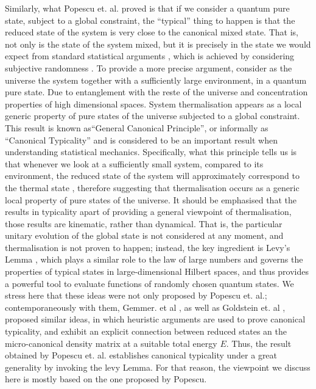 Similarly, what Popescu et. al. proved is that if we consider a quantum pure state, subject to a global constraint, the ``typical'' thing to happen is that the reduced state of the system is  very close to the canonical mixed state. That is, not only is the state of the system mixed, but it is precisely in the state we would expect from standard statistical arguments \cite{popescu_foundations_2005}, which is achieved by considering  subjective randomness \cite{deutsch_thermodynamic_2010,singh_foundations_2013}. To provide a more precise argument, consider as the universe the system together with a sufficiently large environment, in a quantum pure state. Due to entanglement with the reste of the universe and concentration properties of high dimensional spaces. System thermalisation appears as a local generic property of pure states of the universe subjected to a global constraint. This result is known as``General Canonical Principle'', or informally as ``Canonical Typicality'' and is considered to be an important result when understanding statistical mechanics. Specifically, what this principle tells us is that whenever we look at a sufficiently small system, compared to its environment, the reduced state of the system will approximately correspond to the thermal state \cite{popescu_foundations_2005, popescu_entanglement_2006, goldstein_canonical_2006, gemmer_quantum_2004},  therefore suggesting that thermalisation occurs as a generic local property of pure states of the universe. It should be emphasised that the results in typicality apart of providing a general viewpoint of thermalisation, those results are kinematic, rather than dynamical. That is, the particular unitary evolution of the global state is not considered at any moment, and thermalisation is not proven to happen; instead, the key ingredient is Levy's Lemma \cite{milman_asymptotic_2009,ledoux_concentration_2005}, which plays a similar role to the law of large numbers and governs the properties of typical states in large-dimensional Hilbert spaces\cite{popescu_foundations_2005}, and thus provides a powerful tool to evaluate functions of randomly chosen quantum states. We stress here that these ideas were not only proposed by Popescu et. al.; contemporaneously with them,  Gemmer. et al \cite{gemmer_quantum_2004}, as well as Goldstein et. al \cite{goldstein_canonical_2006}, proposed similar ideas, in which heuristic arguments are used to prove canonical typicality, and exhibit an explicit connection between reduced states an the micro-canonical density matrix at a suitable total energy $E$. Thus, the result obtained by Popescu et. al. establishes canonical typicality under a great generality by invoking the levy Lemma\cite{popescu_foundations_2005,milman_asymptotic_2009,ledoux_concentration_2005}. For that reason, the viewpoint we discuss here is mostly based on the one proposed by Popescu.\\

